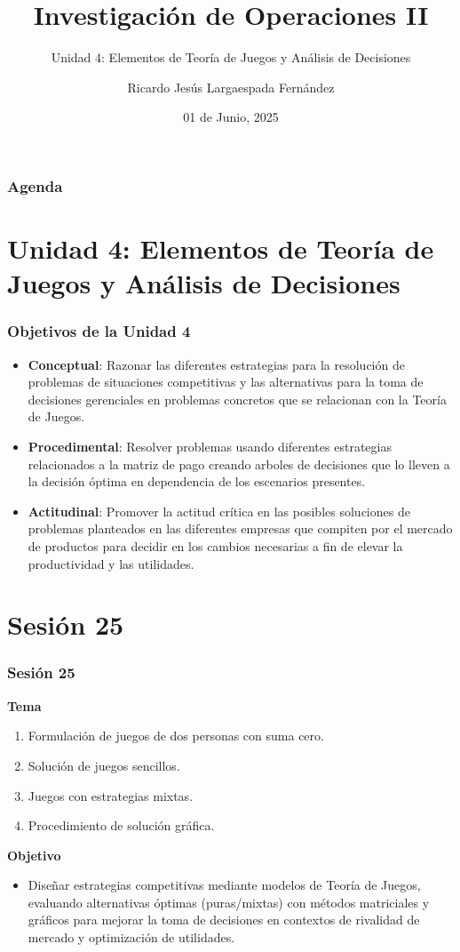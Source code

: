 \documentclass{beamer}
\title{Investigación de Operaciones II}
\subtitle{Unidad 4: Elementos de Teoría de Juegos y Análisis de Decisiones}
\author[Ricardo Largaespada]{Ricardo Jesús Largaespada Fernández}
\institute[UNI]{Ingeniería de Sistemas, DACTIC, UNI}
\date{01 de Junio, 2025}
\begin{document}
\frame{\titlepage}

\begin{frame}
\frametitle{Agenda}
\tableofcontents
\end{frame}

\section{Unidad 4: Elementos de Teoría de Juegos y Análisis de Decisiones}
\begin{frame}
\frametitle{Objetivos de la Unidad 4}
\begin{itemize}
    \item \textbf{Conceptual}: Razonar las diferentes estrategias para la resolución de problemas de situaciones competitivas y las alternativas para la toma de decisiones gerenciales en problemas concretos que se relacionan con la Teoría de Juegos.
    \item \textbf{Procedimental}: Resolver problemas usando diferentes estrategias relacionados a la matriz de pago creando arboles de decisiones que lo lleven a la decisión óptima en dependencia de los escenarios presentes.
    \item \textbf{Actitudinal}: Promover la actitud crítica en las posibles soluciones de problemas planteados en las diferentes empresas que compiten por el mercado de productos para decidir en los cambios necesarias a fin de elevar la productividad y las utilidades.
\end{itemize}
\end{frame}

\section*{Sesión 25}
\begin{frame}
\frametitle{Sesión 25}

\textbf{Tema}
\begin{enumerate}
\item Formulación de juegos de dos personas con suma cero.  
\pause
\item Solución de juegos sencillos.
\pause
\item Juegos con estrategias mixtas.  
\pause
\item Procedimiento de solución gráfica.
\end{enumerate}
\pause
\textbf{Objetivo}
\begin{itemize}
    \item Diseñar estrategias competitivas mediante modelos de Teoría de Juegos, evaluando alternativas óptimas (puras/mixtas) con métodos matriciales y gráficos para mejorar la toma de decisiones en contextos de rivalidad de mercado y optimización de utilidades.
\end{itemize}
\end{frame}
\end{document}
